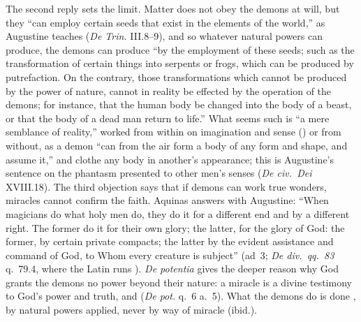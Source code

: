 The second reply sets the limit. Matter does not obey the demons at will,
but they ``can employ certain seeds that exist in the elements of the
world,'' as Augustine teaches (\emph{De Trin.} III.8--9), and so whatever
natural powers can produce, the demons can produce ``by the employment of
these seeds; such as the transformation of certain things into serpents or
frogs, which can be produced by putrefaction. On the contrary, those
transformations which cannot be produced by the power of nature, cannot in
reality be effected by the operation of the demons; for instance, that the
human body be changed into the body of a beast, or that the body of a dead
man return to life.'' What seems such is ``a mere semblance of reality,''
worked from within on imagination and sense () or
from without, as a demon ``can from the air form a body of any form and
shape, and assume it,'' and clothe any body in another's appearance; this
is Augustine's sentence on the phantasm presented to other men's senses
(\emph{De civ.\ Dei} XVIII.18). The third objection says that if demons can
work true wonders, miracles cannot confirm the faith. Aquinas answers with
Augustine: ``When magicians do what holy men do, they do it for a different
end and by a different right. The former do it for their own glory; the
latter, for the glory of God: the former, by certain private compacts; the
latter by the evident assistance and command of God, to Whom every creature
is subject'' (ad~3; \emph{De div.\ qq.\ 83} q.~79.4, where the Latin runs
). \emph{De potentia} gives
the deeper reason why God grants the demons no power beyond their nature:
a miracle is a divine testimony to God's power and truth, and  (\emph{De pot.} q.~6 a.~5). What the demons do is
done , by natural powers applied, never by way of
miracle (ibid.).

